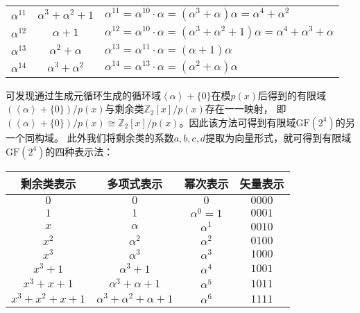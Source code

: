 \begin{Solution}
{\begin{tabular}{ccl}
    $\alpha^{11}$&$\alpha^3 + \alpha^2 + 1$             &$\alpha^{11} = \alpha^{10}\cdot\alpha = (\alpha^3 + \alpha) \alpha = \alpha^4 + \alpha^2$\\       
    $\alpha^{12}$&$\alpha + 1$                          &$\alpha^{12}=\alpha^{10}\cdot\alpha = (\alpha^3 + \alpha^2 + 1)\alpha=\alpha^4+\alpha^3+\alpha$\\       
    $\alpha^{13}$&$\alpha^2 + \alpha$                   &$\alpha^{13}=\alpha^{11}\cdot\alpha = (\alpha + 1)\alpha$\\       
    $\alpha^{14}$&$\alpha^3 + \alpha^2$                 &$\alpha^{14}=\alpha^{13}\cdot\alpha = (\alpha^2 + \alpha)\alpha$\\       
    \bottomrule
\end{tabular}}


\newpage
可发现通过生成元循环生成的循环域$\left<\alpha\right> + \{0\}$在模$p(x)$后得到的有限域$(\left<\alpha\right>+ \{0\})/p(x)$与剩余类$\mathbb{Z}_2[x]/p(x)$存在一一映射，
即$(\left<\alpha\right>+ \{0\})/p(x)\cong \mathbb{Z}_2[x]/p(x)$。因此该方法可得到有限域$\mathrm{GF}(2^4)$的另一个同构域。
此外我们将剩余类的系数$a,b,c,d$提取为向量形式，就可得到有限域$\mathrm{GF}(2^4)$的四种表示法：
\begin{center}
    \begin{tabular}{cccc}
        \toprule
        剩余类表示 & 多项式表示 & 幂次表示 & 矢量表示\\
        \midrule
        $0$                             &$0$                                    &$0$                 & $0000$  \\
        $1$                             &$1$                                    &$\alpha^0 = 1$      & $0001$  \\
        $x$                             &$\alpha$                               &$\alpha^1$          & $0010$  \\
        $x^2$                           &$\alpha^2$                             &$\alpha^2$          & $0100$  \\
        $x^3$                           &$\alpha^3$                             &$\alpha^3$          & $1000$  \\
        $x^3 + 1$                       &$\alpha^3 + 1$                         &$\alpha^4$          & $1001$  \\
        $x^3 + x + 1$                   &$\alpha^3 + \alpha + 1$                &$\alpha^5$          & $1011$  \\
        $x^3 + x^2 + x + 1$             &$\alpha^3 + \alpha^2 + \alpha + 1$     &$\alpha^6$          & $1111$  \\

\end{tabular}
\end{center}
\end{Solution}

